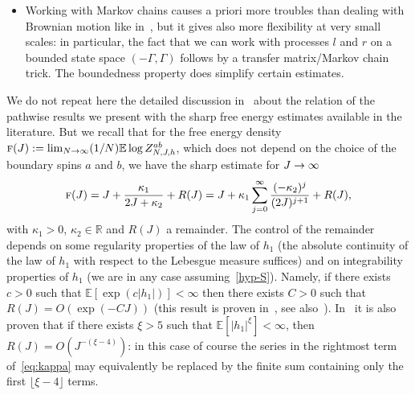 \documentclass[10pt]{amsart}
\theoremstyle{definition}\newtheorem{defi}[theo]{Definition}\newtheorem{rema}[theo]{Remark}\newtheorem{exam}[theo]{Example}\newtheorem{exem}[theo]{Example}\newtheorem{nota}[theo]{Notation}
\newcommand{\bbE}{\mathbb{E}}
\newcommand{\bbR}{\mathbb{R}}
\newcommand{\gG}{\Gamma}
\newcommand{\tf}{\textsc{f}}
\renewcommand*{\to}{\mathchoice{\longrightarrow}{\rightarrow}{\rightarrow}{\rightarrow}}
\begin{document}
\begin{itemize}
\item Working with Markov chains causes a priori more troubles than dealing with Brownian motion like in~\cite{cf:CGH1}, but it gives also more flexibility at very small scales: in particular, the fact that we can work with processes $l$ and $r$ on a bounded state space $(-\gG,\gG)$ follows by a transfer matrix/Markov chain trick. The boundedness property does simplify certain estimates.
\end{itemize}


We do not repeat here the detailed discussion in~\cite[Section~2.4]{cf:CGH1} about the relation of the pathwise results we present with the sharp free energy estimates available in the literature. But we recall that for the free energy density $\tf (J):= \lim_{N \to \infty}(1/N) \bbE\log Z_{N, J, h}^{ab}$, which does not depend on the choice of the boundary spins $a$ and $b$, we have the sharp estimate for $J \to \infty$
\begin{equation}\label{eq:kappa}
\tf (J) = J+\frac{\kappa_1}{2J + \kappa_2} +R(J)= J+ \kappa_1 \sum_{j=0}^\infty \frac{(-\kappa_2)^j}{(2J)^{j+1}}+R(J),
\end{equation}
with $\kappa_1>0$, $\kappa_2\in \bbR$ and $R(J)$ a remainder. The control of the remainder depends on some regularity properties of the law of $h_1$ (the absolute continuity of the law of $h_1$ with respect to the Lebesgue measure suffices) and on integrability properties of $h_1$ (we are in any case assuming~\eqref{hyp-S}). Namely, if there exists $c>0$ such that $\bbE[\exp(c | h_1 |)]< \infty$ then there exists $C>0$ such that $R(J)=O(\exp(-CJ))$ (this result is proven in~\cite{cf:CGGH}, see also~\cite{cf:GG22}). In~\cite{cf:CGGH} it is also proven that if there exists $\xi>5$ such that $\bbE[| h_1 | ^\xi] < \infty$, then $R(J)=O(J^{-(\xi-4)})$: in this case of course the series in the rightmost term of~\eqref{eq:kappa} may equivalently be replaced by the finite sum containing only the first $\lfloor \xi-4\rfloor$ terms.
\end{document}
